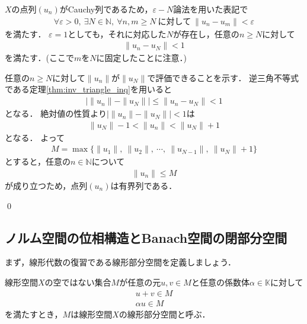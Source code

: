 \begin{Proof}
$X$の点列$(u_n)$がCauchy列であるため，$\varepsilon - N$論法を用いた表記で
\begin{align*}
  \forall \varepsilon > 0, ~ \exists N \in {\mathbb N}, ~ \forall n, m \ge N ~ \mbox{に対して} ~ \| u_n - u_m \| < \varepsilon
\end{align*}
を満たす．
$\varepsilon = 1$としても，それに対応した$N$が存在し，任意の$n \ge N$に対して
\begin{align*}
\| u_n - u_N \| < 1
\end{align*}
を満たす．(ここで$m$を$N$に固定したことに注意．)

任意の$n \ge N$に対して$\| u_n \|$が$\| u_N \|$で評価できることを示す．
逆三角不等式である定理\ref{thm:inv_triangle_inq}を用いると
\begin{align*}
| \| u_n \| - \| u_N \| | \le  \| u_n - u_N \| < 1
\end{align*}
となる．
絶対値の性質より$| \| u_n \| - \| u_N \| | < 1$は
\begin{align*}
\| u_N \| - 1 < \| u_n \| < \| u_N \| + 1
\end{align*}
となる．
よって
\begin{align*}
M = \max \{ \| u_1 \|, ~ \| u_2 \|, ~ \cdots, ~ \| u_{N -1} \|, ~ \| u_N \| + 1 \}
\end{align*}
とすると，任意の$n \in {\mathbb N}$について
\begin{align*}
\| u_n \| \le M
\end{align*}
が成り立つため，点列$(u_n)$は有界列である．


\qed
\end{Proof}



\subsection{ノルム空間の位相構造とBanach空間の閉部分空間}\label{sec:subset_Banach}
まず，線形代数の復習である線形部分空間を定義しましょう．

\begin{defi}[線形部分空間]\label{def:linearsubspace}
	線形空間$X$の空ではない集合$M$が任意の元$u,v \in M$と任意の係数体$\alpha \in {\mathbb K}$に対して
	\begin{align*}
	u + v \in M \\
	\alpha u \in M
	\end{align*}
	を満たすとき，$M$は線形空間$X$の線形部分空間と呼ぶ．
\end{defi}


